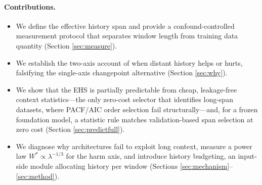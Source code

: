 \paragraph{Contributions.}
\begin{itemize}
    \item We define the effective history span and provide a confound-controlled measurement protocol that separates window length from training data quantity (Section \ref{sec:measure}).
    \item We establish the two-axis account of when distant history helps or hurts, falsifying the single-axis changepoint alternative (Section \ref{sec:why}).
    \item We show that the EHS is partially predictable from cheap, leakage-free context statistics---the only zero-cost selector that identifies long-span datasets, where PACF/AIC order selection fail structurally---and, for a frozen foundation model, a statistic rule matches validation-based span selection at zero cost (Section \ref{sec:predictfull}).
    \item We diagnose why architectures fail to exploit long context, measure a power law $W^* \propto \lambda^{-1/3}$ for the harm axis, and introduce history budgeting, an input-side module allocating history per window (Sections \ref{sec:mechanism}--\ref{sec:method}).
\end{itemize}
